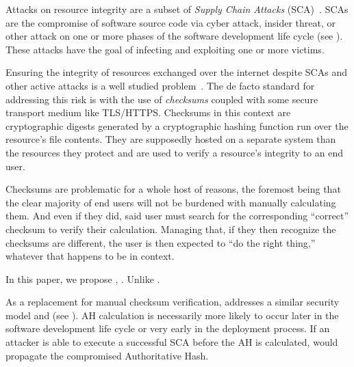 Attacks on resource integrity are a subset of \emph{Supply Chain Attacks}
(SCA)~\cite{SCA}. SCAs are the compromise of software source code via cyber
attack, insider threat, or other attack on one or more phases of the software
development life cycle (see ). These attacks have the goal of
infecting and exploiting one or more victims.


Ensuring the integrity of resources exchanged over the internet despite SCAs and
other active attacks is a well studied problem~\cite{MD5Header, HTTP1.1, HTTPS,
SRI, LF, OpenPGP1, DNSSEC, PKI}. The de facto standard for addressing this risk
is with the use of \textit{checksums} coupled with some secure transport medium
like TLS/HTTPS. Checksums in this context are cryptographic digests generated by
a cryptographic hashing function run over the resource's file contents. They are
supposedly hosted on a separate system than the resources they protect and are
used to verify a resource’s integrity to an end user.


Checksums are problematic for a whole host of reasons, the foremost being that
the clear majority of end users will not be burdened with manually calculating
them. And even if they did, said user must search for the corresponding
``correct'' checksum to verify their calculation. Managing that, if they then
recognize the checksums are different, the user is then expected to ``do the
right thing,'' whatever that happens to be in context.


In this paper, we propose \SYSTEM{}, . Unlike .

As a replacement for manual checksum verification, \SYSTEM{} addresses a similar
security model and   (see ). AH calculation is necessarily more
likely to occur later in the software development life cycle or very early in
the deployment process. If an attacker is able to execute a successful SCA
before the AH is calculated, \SYSTEM{} would propagate the compromised
Authoritative Hash.

